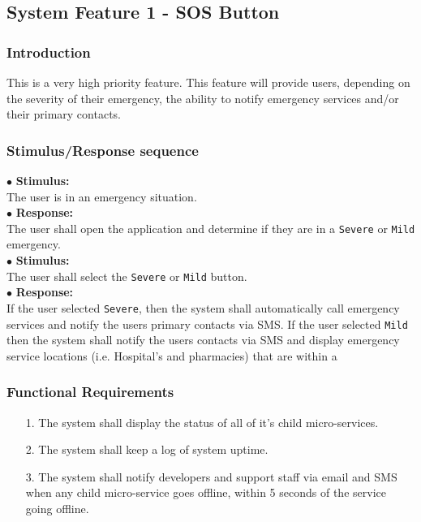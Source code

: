 \documentclass{scrreprt}
\begin{document}
\subsection{System Feature 1 - SOS Button}
\subsubsection{Introduction}
This is a very high priority feature. This feature will provide users, depending on the severity of their emergency, the ability to notify emergency services and/or their primary contacts.

\subsubsection{Stimulus/Response sequence}
\vspace{5mm}
	$\bullet$ \textbf{Stimulus:} \\ \hspace{5mm} The user is in an emergency situation. \\
	$\bullet$ \textbf{Response:} \\ \hspace{5mm} The user shall open the application and determine if they are in a \texttt{Severe} or \texttt{Mild} emergency.
\vspace{5mm}\\
	\hspace{-4.75mm} $\bullet$ \textbf{Stimulus:} \\ \hspace{5mm} The user shall select the \texttt{Severe} or \texttt{Mild} button.\\
	$\bullet$ \textbf{Response:} \\ \hspace{5mm} If the user selected \texttt{Severe}, then the system shall automatically call emergency services and notify the users primary contacts via SMS. If the user selected \texttt{Mild} then the system shall notify the users contacts via SMS and display emergency service locations (i.e. Hospital's and pharmacies) that are within a 
\\
\subsubsection{Functional Requirements}
\begin{enumerate}
	\item[1.] The system shall display the status of all of it's child micro-services.
	\item[2.] The system shall keep a log of system uptime.
	\item[3.] The system shall notify developers and support staff via email and SMS when any child micro-service goes offline, within 5 seconds of the service going offline.
\end{enumerate}
\end{document}
